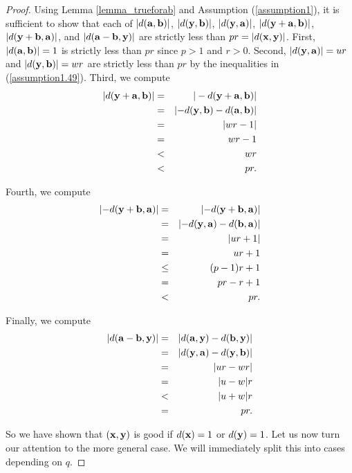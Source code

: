 \begin{proof}
	Using Lemma \ref{lemma_trueforab} and Assumption (\ref{assumption1}), it is sufficient to show that each of $\lvert d({\mathbf{a}}, {\mathbf{b}}) \rvert$, $\lvert d({\mathbf{y}},{\mathbf{b}}) \rvert$, $ \lvert d({\mathbf{y}},{\mathbf{a}}) \rvert$, $\lvert d({\mathbf{y}}+{\mathbf{a}},{\mathbf{b}}) \rvert$, $\lvert d({\mathbf{y}}+{\mathbf{b}},{\mathbf{a}}) \rvert$, and $\lvert d({\mathbf{a}}-{\mathbf{b}},{\mathbf{y}}) \rvert$ are strictly less than $pr = \lvert d({\mathbf{x}},{\mathbf{y}}) \rvert$. First, $ \lvert d({\mathbf{a}},{\mathbf{b}}) \rvert = 1$ is strictly less than $pr$ since $p>1$ and $r>0$. Second, $ \lvert d({\mathbf{y}},{\mathbf{a}}) \rvert = ur $ and $ \lvert d({\mathbf{y}},{\mathbf{b}}) \rvert = wr $ are strictly less than $pr$ by the inequalities in (\ref{assumption1.49}). Third, we compute
	\begin{eqnarray*}
		\vert d({\mathbf{y}}+{\mathbf{a}}, {\mathbf{b}}) \rvert &=&\vert - d({\mathbf{y}}+{\mathbf{a}}, {\mathbf{b}}) \rvert \\
		&=& \lvert - d({\mathbf{y}},{\mathbf{b}}) - d({\mathbf{a}}, {\mathbf{b}}) \rvert \\
		&=& \lvert wr - 1 \rvert \\
		&=& wr-1 \\
		&<& wr \\
		&<& pr.
	\end{eqnarray*}

	Fourth, we compute
	\begin{eqnarray*}
		\lvert -d({\mathbf{y}}+{\mathbf{b}}, {\mathbf{a}}) \rvert &=& \lvert -d({\mathbf{y}}+{\mathbf{b}}, {\mathbf{a}}) \rvert \\
		&=& \lvert -d({\mathbf{y}},{\mathbf{a}}) - d({\mathbf{b}}, {\mathbf{a}}) \rvert \\
		&=& \lvert ur + 1 \rvert \\
		&=& ur+1 \\
		&\leq& (p-1)r+1 \\
		&=& pr-r+1 \\
		&<& pr.
	\end{eqnarray*}

	Finally, we compute
	\begin{eqnarray*}
		\lvert d({\mathbf{a}}-{\mathbf{b}},{\mathbf{y}}) \rvert &=& \lvert d({\mathbf{a}},{\mathbf{y}}) - d({\mathbf{b}},{\mathbf{y}}) \rvert \\
		&=& \lvert d({\mathbf{y}},{\mathbf{a}}) - d({\mathbf{y}},{\mathbf{b}}) \rvert \\
		&=& \lvert ur - wr \rvert \\
		&=& \lvert u-w \rvert r \\
		&<& \lvert u+w \rvert r \\
		&=& pr.	
	\end{eqnarray*}
	
	So we have shown that $({\mathbf{x}},{\mathbf{y}})$ is good if $d({\mathbf{x}})=1$ or $d({\mathbf{y}})=1$. Let us now turn our attention to the more general case. We will immediately split this into cases depending on $q$.
	

\end{proof}
